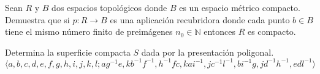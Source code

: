 \documentclass[12pt]{article}
\begin{document}
    \begin{ejercicio}
        Sean $R$ y $B$ dos espacios topológicos donde $B$ es un espacio métrico compacto. Demuestra que si $p:R\to B$ es una aplicación recubridora donde cada punto $b\in B$ tiene el mismo número finito de preimágenes $n_0\in \mathbb{N}$ entonces $R$ es compacto.
    \end{ejercicio}

    \begin{ejercicio}
        Determina la superficie compacta $S$ dada por la presentación poligonal.
        \begin{equation*}
            \langle a,b,c,d,e,f,g,h,i,j,k,l;ag^{-1}e,kb^{-1}f^{-1},h^{-1}fc,kai^{-1},jc^{-1}l^{-1},bi^{-1}g,jd^{-1}h^{-1}, edl^{-1} \rangle 
        \end{equation*}
    \end{ejercicio}
\end{document}

